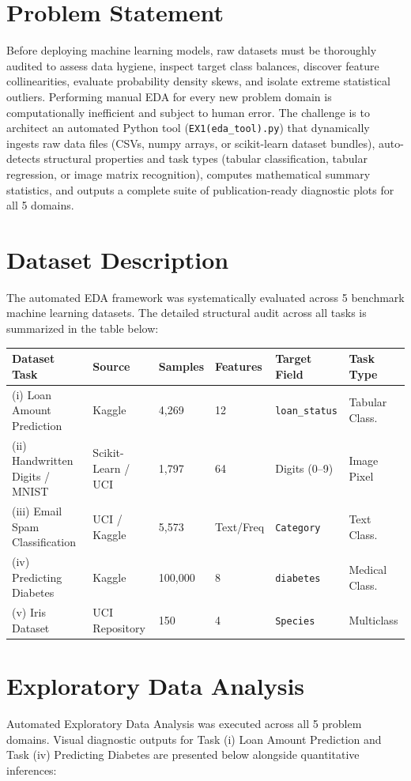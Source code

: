 \documentclass[12pt,a4paper]{article}
\begin{document}
\section{Problem Statement}
Before deploying machine learning models, raw datasets must be thoroughly audited to assess data hygiene, inspect target class balances, discover feature collinearities, evaluate probability density skews, and isolate extreme statistical outliers. Performing manual EDA for every new problem domain is computationally inefficient and subject to human error. The challenge is to architect an automated Python tool (\texttt{EX1(eda\_tool).py}) that dynamically ingests raw data files (CSVs, numpy arrays, or scikit-learn dataset bundles), auto-detects structural properties and task types (tabular classification, tabular regression, or image matrix recognition), computes mathematical summary statistics, and outputs a complete suite of publication-ready diagnostic plots for all 5 domains.

\section{Dataset Description}
The automated EDA framework was systematically evaluated across 5 benchmark machine learning datasets. The detailed structural audit across all tasks is summarized in the table below:

\begin{longtable}{|p{4.2cm}|p{3.2cm}|p{1.8cm}|p{1.8cm}|p{2.2cm}|p{1.8cm}|}
\hline
Dataset Task & Source & Samples & Features & Target Field & Task Type \\ \hline
(i) Loan Amount Prediction & Kaggle & 4,269 & 12 & \texttt{loan\_status} & Tabular Class. \\ \hline
(ii) Handwritten Digits / MNIST & Scikit-Learn / UCI & 1,797 & 64 & Digits (0--9) & Image Pixel \\ \hline
(iii) Email Spam Classification & UCI / Kaggle & 5,573 & Text/Freq & \texttt{Category} & Text Class. \\ \hline
(iv) Predicting Diabetes & Kaggle & 100,000 & 8 & \texttt{diabetes} & Medical Class. \\ \hline
(v) Iris Dataset & UCI Repository & 150 & 4 & \texttt{Species} & Multiclass \\ \hline
\end{longtable}

\section{Exploratory Data Analysis}
Automated Exploratory Data Analysis was executed across all 5 problem domains. Visual diagnostic outputs for Task (i) Loan Amount Prediction and Task (iv) Predicting Diabetes are presented below alongside quantitative inferences:
\end{document}
